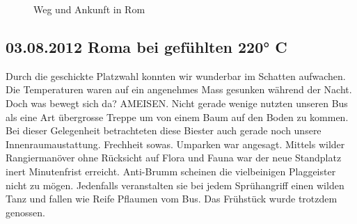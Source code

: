 \begin{figure}[h]
   \centering
   \quad
   \quad
   \quad
   \caption[Weg und Ankunft in Rom]{Weg und Ankunft in Rom}
\end{figure}

\subsection{03.08.2012 Roma bei gefühlten 220° C}
Durch die geschickte Platzwahl konnten wir wunderbar im Schatten aufwachen.
Die Temperaturen waren auf ein angenehmes Mass gesunken während der Nacht.
Doch was bewegt sich da? AMEISEN.
Nicht gerade wenige nutzten unseren Bus als eine Art übergrosse Treppe um von einem Baum auf den Boden zu kommen.
Bei dieser Gelegenheit betrachteten diese Biester auch gerade noch unsere Innenraumaustattung.
Frechheit sowas.
Umparken war angesagt.
Mittels wilder Rangiermanöver ohne Rücksicht auf Flora und Fauna war der neue Standplatz inert Minutenfrist erreicht.
Anti-Brumm scheinen die vielbeinigen Plaggeister nicht zu mögen.
Jedenfalls veranstalten sie bei jedem Sprühangriff einen wilden Tanz und fallen wie Reife Pflaumen vom Bus.
Das Frühstück wurde trotzdem genossen.

